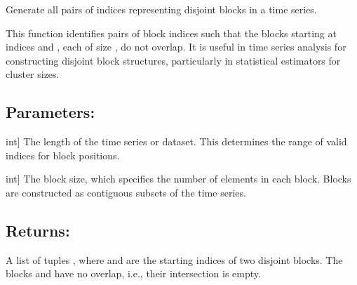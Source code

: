 \documentclass[a4paper,11pt,openany,english]{sphinxmanual}
\begin{document}
\begin{fulllineitems}
\label{\detokenize{api_biascorrection:xtremes.biascorrection.D_n}}
\pysigstartsignatures
{}
\pysigstopsignatures
\sphinxAtStartPar
Generate all pairs of indices representing disjoint blocks in a time series.

\sphinxAtStartPar
This function identifies pairs of block indices  such that the blocks 
starting at indices  and , each of size , do not overlap. 
It is useful in time series analysis for constructing disjoint block structures, 
particularly in statistical estimators for cluster sizes.


\subsection{Parameters:}
\label{\detokenize{api_biascorrection:id1}}\begin{description}
\sphinxlineitem{n}{[}int{]}
\sphinxAtStartPar
The length of the time series or dataset. This determines the range of 
valid indices for block positions.

\sphinxlineitem{bs}{[}int{]}
\sphinxAtStartPar
The block size, which specifies the number of elements in each block.
Blocks are constructed as contiguous subsets of the time series.

\end{description}


\subsection{Returns:}
\label{\detokenize{api_biascorrection:id2}}\begin{description}
\sphinxAtStartPar
A list of tuples , where  and  are the starting indices 
of two disjoint blocks. The blocks  and  have 
no overlap, i.e., their intersection is empty.

\end{description}



\end{fulllineitems}
\end{document}
